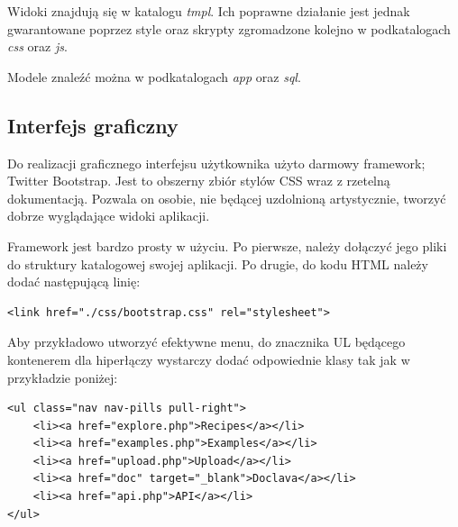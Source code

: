 \documentclass[11pt,a4paper,polish,thesis]{dcsbook}
\begin{document}
Widoki znajdują się w katalogu \emph{tmpl}. Ich poprawne działanie jest jednak gwarantowane poprzez style oraz skrypty zgromadzone kolejno w podkatalogach
\emph{css} oraz \emph{js}.

Modele znaleźć można w podkatalogach \emph{app} oraz \emph{sql}.

\subsection{Interfejs graficzny}
Do realizacji graficznego interfejsu użytkownika użyto darmowy framework; Twitter Bootstrap. Jest to obszerny zbiór stylów CSS wraz z rzetelną dokumentacją. Pozwala on
osobie, nie będącej uzdolnioną artystycznie, tworzyć dobrze wyglądające widoki aplikacji.

Framework jest bardzo prosty w użyciu. Po pierwsze, należy dołączyć jego pliki do struktury katalogowej swojej aplikacji. Po drugie, do kodu HTML należy dodać
następującą linię:
\begin{verbatim}
<link href="./css/bootstrap.css" rel="stylesheet">
\end{verbatim}

Aby przykładowo utworzyć efektywne menu, do znacznika UL będącego kontenerem dla hiperłączy wystarczy dodać odpowiednie klasy tak jak w przykładzie poniżej:
\begin{verbatim}
<ul class="nav nav-pills pull-right">
	<li><a href="explore.php">Recipes</a></li>
	<li><a href="examples.php">Examples</a></li>
	<li><a href="upload.php">Upload</a></li>
	<li><a href="doc" target="_blank">Doclava</a></li>
	<li><a href="api.php">API</a></li>
</ul>
\end{verbatim}
\end{document}
